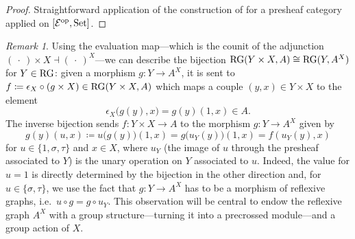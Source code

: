 \documentclass[a4paper, british, reqno]{amsart}
\newcommand*{\comp}{\circ}
\newcommand*{\from}{\colon}
\newcommand*{\eqdef}{\coloneq}
\newcommand*{\iso}{\cong}
\newcommand*{\placeholder}{\:\cdot\:}
\newcommand*{\adj}{\dashv}
\newcommand*{\opp}[1]{{#1}^{\operatorfont op}}
\newcommand*{\CatSymb}[1]{\mathcal{#1}}
\newcommand*{\CatName}[1]{\textnormal{#1}}
\newcommand*{\E}{\CatSymb{E}}
\newcommand*{\RG}{\CatName{RG}}
\newcommand*{\Set}{\CatName{Set}}
\theoremstyle{definition}
\theoremstyle{remark}
\newtheorem{remark}[theorem]{Remark}
\begin{document}
\begin{proof}
	Straightforward application of the construction of \cite[Section~I.6, Proposition~1]{MacLane-Moerdijk} for a presheaf category applied on \([\opp{\E}, \Set]\).
\end{proof}

\begin{remark}
	Using the evaluation map---which is the counit of the adjunction \((\placeholder) \times X \adj (\placeholder)^X\)---we can describe the bijection \(\RG(Y \times X , A) \iso \RG(Y , A^X)\) for \(Y \in \RG\): given a morphism \(g \from Y \to A^X\), it is sent to \(f \eqdef \epsilon_X \comp (g \times X) \in \RG(Y \times X , A)\) which maps a couple \((y,x) \in Y \times X\) to the element
	\[
		\epsilon_X\bigl(g(y),x\bigr) = g(y)(1,x) \in A\text{.}
	\]
	The inverse bijection sends	\(f \from Y \times X \to A\) to the morphism \(g \from Y \to A^X\) given by
	\[
		g(y)(u,x) \eqdef u\bigl(g(y)\bigr)(1,x) = g\bigl(u_Y(y)\bigr)(1,x) = f(u_Y(y),x)
	\]
	for \(u\in \{1,\sigma, \tau\}\) and \(x\in X\), where \(u_Y\) (the image of \(u\) through the presheaf associated to \(Y\)) is the unary operation on \(Y\) associated to \(u\). Indeed, the value for \(u=1\) is directly determined by the bijection in the other direction and, for \(u \in \{\sigma,\tau\}\), we use the fact that \(g \from Y \to A^X\) has to be a morphism of reflexive graphs, i.e.\ \(u\circ g=g\circ u_Y\). This observation will be central to endow the reflexive graph \(A^X\) with a group structure---turning it into a precrossed module---and a group action of \(X\).
\end{remark}
\end{document}
